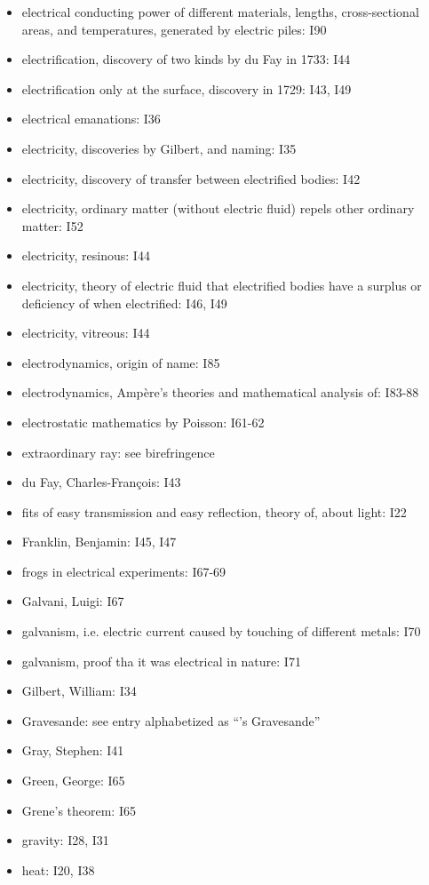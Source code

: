 \documentclass[a4paper]{article}
\theoremstyle{plain}
\theoremstyle{definition}
\begin{document}
\begin{itemize}
\item electrical conducting power of different materials, lengths, cross-sectional areas, and temperatures, generated by electric piles: I90
\item electrification, discovery of two kinds by du Fay in 1733: I44
\item electrification only at the surface, discovery in 1729: I43, I49
\item electrical emanations: I36
\item electricity, discoveries by Gilbert, and naming: I35
\item electricity, discovery of transfer between electrified bodies: I42
\item electricity, ordinary matter (without electric fluid) repels other ordinary matter: I52
\item electricity, resinous: I44
\item electricity, theory of electric fluid that electrified bodies have a surplus or deficiency of when electrified: I46, I49
\item electricity, vitreous: I44
\item electrodynamics, origin of name: I85
\item electrodynamics, Amp\`{e}re's theories and mathematical analysis of: I83-88
\item electrostatic mathematics by Poisson: I61-62
\item extraordinary ray: see birefringence
\item du Fay, Charles-Fran\c{c}ois: I43
\item fits of easy transmission and easy reflection, theory of, about light: I22
\item Franklin, Benjamin: I45, I47
\item frogs in electrical experiments: I67-69
\item Galvani, Luigi: I67
\item galvanism, i.e. electric current caused by touching of different metals: I70
\item galvanism, proof tha it was electrical in nature: I71
\item Gilbert, William: I34
\item Gravesande: see entry alphabetized as ``'s Gravesande''
\item Gray, Stephen: I41
\item Green, George: I65
\item Grene's theorem: I65
\item gravity: I28, I31
\item heat: I20, I38

\end{itemize}
\end{document}
